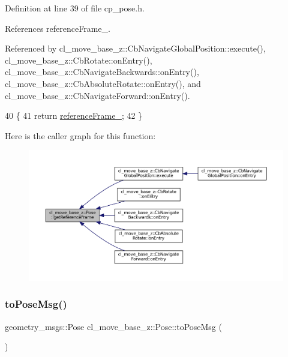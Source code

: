Definition at line 39 of file cp\+\_\+pose.\+h.



References reference\+Frame\+\_\+.



Referenced by cl\+\_\+move\+\_\+base\+\_\+z\+::\+Cb\+Navigate\+Global\+Position\+::execute(), cl\+\_\+move\+\_\+base\+\_\+z\+::\+Cb\+Rotate\+::on\+Entry(), cl\+\_\+move\+\_\+base\+\_\+z\+::\+Cb\+Navigate\+Backwards\+::on\+Entry(), cl\+\_\+move\+\_\+base\+\_\+z\+::\+Cb\+Absolute\+Rotate\+::on\+Entry(), and cl\+\_\+move\+\_\+base\+\_\+z\+::\+Cb\+Navigate\+Forward\+::on\+Entry().


\begin{DoxyCode}
40     \{
41         \textcolor{keywordflow}{return} \hyperlink{classcl__move__base__z_1_1Pose_a6a7a593232b6edaf99103d48ad8da9d3}{referenceFrame\_};
42     \}
\end{DoxyCode}
Here is the caller graph for this function\+:
\nopagebreak
\begin{figure}[H]
\begin{center}
\leavevmode
\includegraphics[width=350pt]{classcl__move__base__z_1_1Pose_af8c2dc151e74aa8da6b283d1c8563051_icgraph}
\end{center}
\end{figure}
\mbox{\label{classcl__move__base__z_1_1Pose_a9faf8c6b437ff6b19c8bddd692908dca}} 
\subsubsection{\texorpdfstring{to\+Pose\+Msg()}{toPoseMsg()}}
{\footnotesize\ttfamily geometry\+\_\+msgs\+::\+Pose cl\+\_\+move\+\_\+base\+\_\+z\+::\+Pose\+::to\+Pose\+Msg (\begin{DoxyParamCaption}{ }\end{DoxyParamCaption})\hspace{0.3cm}{\ttfamily [inline]}}



